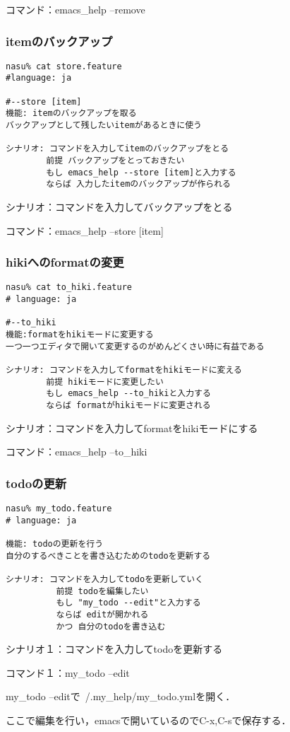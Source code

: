 コマンド：emacs\_help --remove

\subsubsection{itemのバックアップ}\begin{lstlisting}[style=customRuby,basicstyle={\scriptsize\ttfamily}]
nasu% cat store.feature
#language: ja

#--store [item]
機能: itemのバックアップを取る
バックアップとして残したいitemがあるときに使う

シナリオ: コマンドを入力してitemのバックアップをとる
        前提 バックアップをとっておきたい
        もし emacs_help --store [item]と入力する
        ならば 入力したitemのバックアップが作られる
\end{lstlisting}
シナリオ：コマンドを入力してバックアップをとる

コマンド：emacs\_help --store [item]

\subsubsection{hikiへのformatの変更}\begin{lstlisting}[style=customRuby,basicstyle={\scriptsize\ttfamily}]
nasu% cat to_hiki.feature
# language: ja

#--to_hiki
機能:formatをhikiモードに変更する
一つ一つエディタで開いて変更するのがめんどくさい時に有益である

シナリオ: コマンドを入力してformatをhikiモードに変える
        前提 hikiモードに変更したい
        もし emacs_help --to_hikiと入力する
        ならば formatがhikiモードに変更される
\end{lstlisting}
シナリオ：コマンドを入力してformatをhikiモードにする

コマンド：emacs\_help --to\_hiki

\subsubsection{todoの更新}\begin{lstlisting}[style=customRuby,basicstyle={\scriptsize\ttfamily}]
nasu% my_todo.feature
# language: ja

機能: todoの更新を行う
自分のするべきことを書き込むためのtodoを更新する

シナリオ: コマンドを入力してtodoを更新していく
          前提 todoを編集したい
          もし "my_todo --edit"と入力する
          ならば editが開かれる
          かつ 自分のtodoを書き込む

\end{lstlisting}
シナリオ１：コマンドを入力してtodoを更新する

コマンド１：my\_todo --edit

my\_todo --editで~/.my\_help/my\_todo.ymlを開く．

ここで編集を行い，emacsで開いているのでC-x,C-sで保存する．

